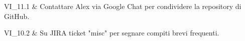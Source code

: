 VI\_11.1 & Contattare Alex via Google Chat per condividere la repository di GitHub.

\tabularnewline
VI\_10.2 & Su JIRA ticket "misc" per segnare compiti brevi frequenti.

